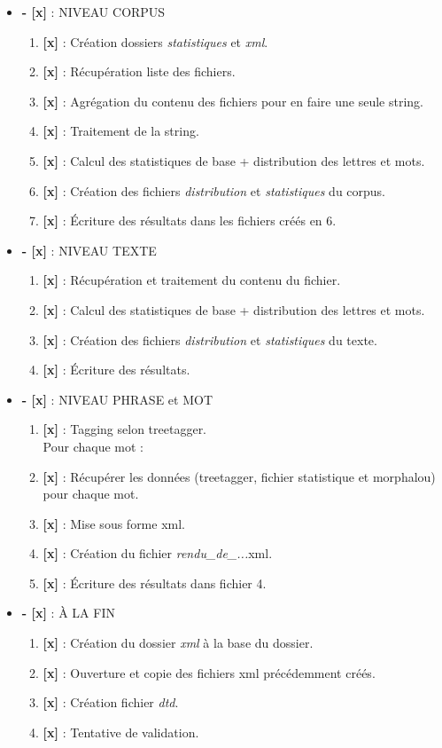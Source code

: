 \begin{itemize}
\item \textbf{- [x] } : NIVEAU CORPUS
\begin{enumerate}
\item \textbf{[x]} : Création dossiers \emph{statistiques} et \emph{xml}.
\item \textbf{[x]} : Récupération liste des fichiers.
\item \textbf{[x]} : Agrégation du contenu des fichiers pour en faire une seule string. 
\item \textbf{[x]} : Traitement de la string.
\item \textbf{[x]} : Calcul des statistiques de base + distribution des lettres et mots.
\item \textbf{[x]} : Création des fichiers \emph{distribution} et \emph{statistiques} du corpus.
\item \textbf{[x]} : Écriture des résultats dans les fichiers créés en  6.
\end{enumerate}
\item \textbf{- [x] } : NIVEAU TEXTE
\begin{enumerate}
\item \textbf{[x]} : Récupération et traitement du contenu du fichier.
\item \textbf{[x]} : Calcul des statistiques de base + distribution des lettres et mots.
\item \textbf{[x]} : Création des fichiers \emph{distribution} et \emph{statistiques} du texte.
\item \textbf{[x]} : Écriture des résultats.
\end{enumerate}
\item \textbf{- [x] } : NIVEAU PHRASE et MOT
\begin{enumerate}
\item \textbf{[x]} : Tagging selon treetagger. \\
Pour chaque mot :
\item \textbf{[x]} : Récupérer les données (treetagger, fichier statistique et morphalou) pour chaque mot.
\item \textbf{[x]} : Mise sous forme xml. 
\item \textbf{[x]} : Création du fichier \emph{rendu\_de\_...}xml. 
\item \textbf{[x]} :  Écriture des résultats dans fichier 4.
\end{enumerate}
\item \textbf{- [x] } : À LA FIN
\begin{enumerate}
\item \textbf{[x]} : Création du dossier \emph{xml} à la base du dossier.
\item \textbf{[x]} : Ouverture et copie des fichiers xml précédemment créés.
\item \textbf{[x]} : Création fichier \emph{dtd}.
\item \textbf{[x]} : Tentative de validation.
\end{enumerate}

\end{itemize}








